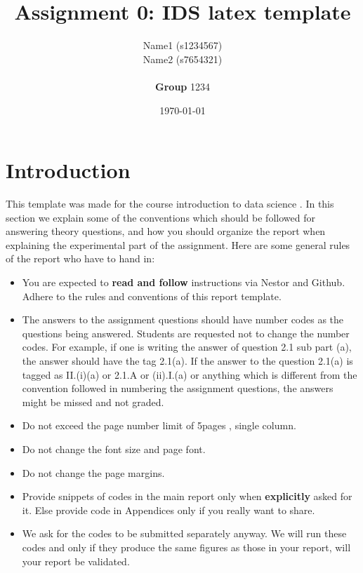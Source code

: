 \documentclass[a4paper]{article}
\title{Assignment 0: IDS latex template}
\author{
Name1 (s1234567) \\ 
Name2 (s7654321) \\ 
 \\ \textbf{Group} 1234}
\date{\today}
\begin{document}
\maketitle

\section*{Introduction}
This template was made for the course introduction to data science \cite{IDS2017}. 
In this section we explain some of the conventions which should be followed for answering theory questions, and how you should organize the report when explaining the experimental part of the 
assignment. Here are some general rules of the report who have to hand in:
\begin{itemize}
 \item You are expected to \textbf{read and follow} instructions via Nestor and Github. Adhere to the rules and conventions of this report template.
 \item The answers to the assignment questions should have number codes as the questions being answered. Students are requested not to change the number codes. For example, if one is writing the 
answer of question 2.1 sub part (a), the answer should have the tag 2.1(a). If the answer to the question 2.1(a) is tagged as II.(i)(a) or 2.1.A or (ii).I.(a) or anything which is different 
from the convention followed in numbering the assignment questions, the answers might be missed and not graded.
\item Do not exceed the page number limit of 5pages , single column.
\item Do not change the font size and page font.
\item Do not change the page margins.
\item Provide snippets of codes in the main report only when \textbf{explicitly} asked for it. Else provide code in Appendices only if you really want to share. 
\item We ask for the codes to be submitted separately anyway. We will run these codes and only if they produce the same figures as those in your report, will your report be validated.
\end{itemize}
\end{document}
